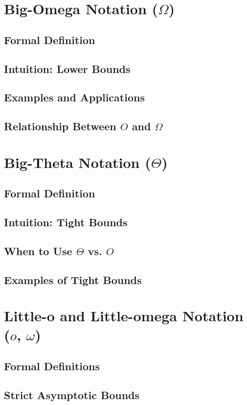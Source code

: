 \section{Big-Omega Notation ($\Omega$)}
\subsection{Formal Definition}
\subsection{Intuition: Lower Bounds}
\subsection{Examples and Applications}
\subsection{Relationship Between $O$ and $\Omega$}

\section{Big-Theta Notation ($\Theta$)}
\subsection{Formal Definition}
\subsection{Intuition: Tight Bounds}
\subsection{When to Use $\Theta$ vs. $O$}
\subsection{Examples of Tight Bounds}

\section{Little-o and Little-omega Notation ($o$, $\omega$)}
\subsection{Formal Definitions}
\subsection{Strict Asymptotic Bounds}
